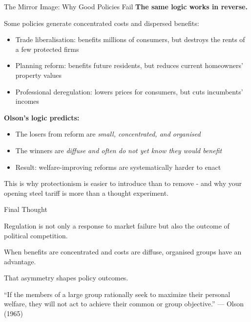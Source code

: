 \documentclass[10pt]{beamer}
\begin{document}
\begin{frame}{The Mirror Image: Why Good Policies Fail}
\textbf{The same logic works in reverse.}

\vspace{0.1cm}
Some policies generate \alert{concentrated costs} and \alert{dispersed benefits}:
\begin{itemize}
\item Trade liberalisation: benefits millions of consumers, but destroys the rents of a few protected firms
\item Planning reform: benefits future residents, but reduces current homeowners' property values
\item Professional deregulation: lowers prices for consumers, but cuts incumbents' incomes
\end{itemize}

\vspace{0.1cm}
\textbf{Olson's logic predicts:}
\begin{itemize}
\item The losers from reform are \emph{small, concentrated, and organised}
\item The winners are \emph{diffuse and often do not yet know they would benefit}
\item Result: welfare-improving reforms are systematically harder to enact
\end{itemize}

\vspace{0.1cm}
\alert{This is why protectionism is easier to introduce than to remove} - and why your opening steel tariff is more than a thought experiment.
\end{frame}

\begin{frame}{Final Thought}
\large

\begin{center}
Regulation is not only a response to market failure but also the outcome of political competition.
\end{center}


\begin{center}
When benefits are concentrated and costs are diffuse,
organised groups have an advantage.

That asymmetry shapes policy outcomes.

“If the members of a large group rationally seek to maximize their personal welfare, they will not act to achieve their common or group objective.”
— Olson (1965)
\end{center}

\end{frame}
\end{document}

